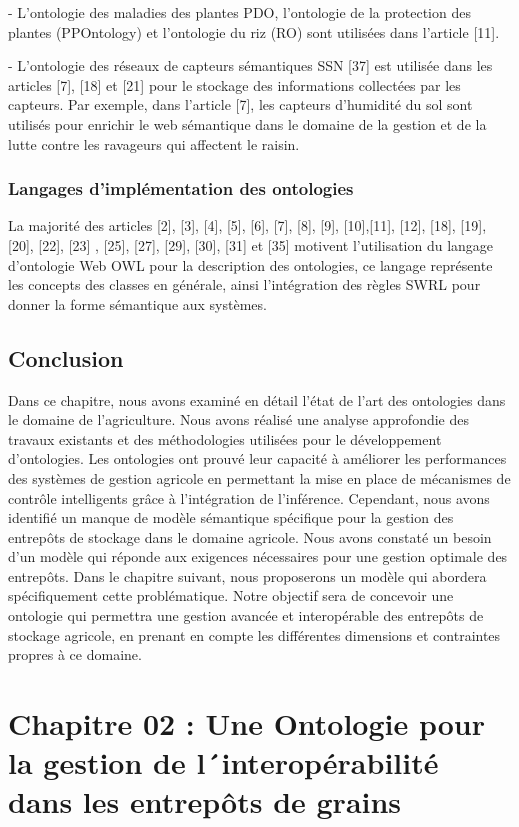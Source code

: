 \documentclass{article}
\begin{document}
	- L'ontologie des maladies des plantes PDO, l'ontologie de la protection des plantes
	(PPOntology) et l'ontologie du riz (RO) sont utilisées dans l'article [11].
	
	- L'ontologie des réseaux de capteurs sémantiques SSN [37] est utilisée dans les articles [7],
	[18] et [21] pour le stockage des informations collectées par les capteurs. Par exemple, dans
	l'article [7], les capteurs d'humidité du sol sont utilisés pour enrichir le web sémantique dans le
	domaine de la gestion et de la lutte contre les ravageurs qui affectent le raisin.
	
	\subsubsection{Langages d’implémentation des ontologies}
	La majorité des articles [2], [3], [4], [5], [6], [7], [8], [9], [10],[11], [12], [18], [19], [20], [22], [23] ,
	[25], [27], [29], [30], [31] et [35] motivent l’utilisation du langage d'ontologie Web OWL pour la
	description des ontologies, ce langage représente les concepts des classes en générale, ainsi
	l’intégration des règles SWRL pour donner la forme sémantique aux systèmes.
	
	\subsection{Conclusion}
	Dans ce chapitre, nous avons examiné en détail l'état de l'art des ontologies dans le
	domaine de l'agriculture. Nous avons réalisé une analyse approfondie des travaux existants et
	des méthodologies utilisées pour le développement d'ontologies. Les ontologies ont prouvé leur
	capacité à améliorer les performances des systèmes de gestion agricole en permettant la mise
	en place de mécanismes de contrôle intelligents grâce à l'intégration de l'inférence.
	Cependant, nous avons identifié un manque de modèle sémantique spécifique pour la gestion
	des entrepôts de stockage dans le domaine agricole. Nous avons constaté un besoin d'un modèle
	qui réponde aux exigences nécessaires pour une gestion optimale des entrepôts. Dans le chapitre
	suivant, nous proposerons un modèle qui abordera spécifiquement cette problématique. Notre
	objectif sera de concevoir une ontologie qui permettra une gestion avancée et interopérable des
	entrepôts de stockage agricole, en prenant en compte les différentes dimensions et contraintes
	propres à ce domaine.
	
	\newpage
	
	\section{Chapitre 02 : Une Ontologie pour la gestion de l´interopérabilité dans
		les entrepôts de grains}
	
\end{document}

